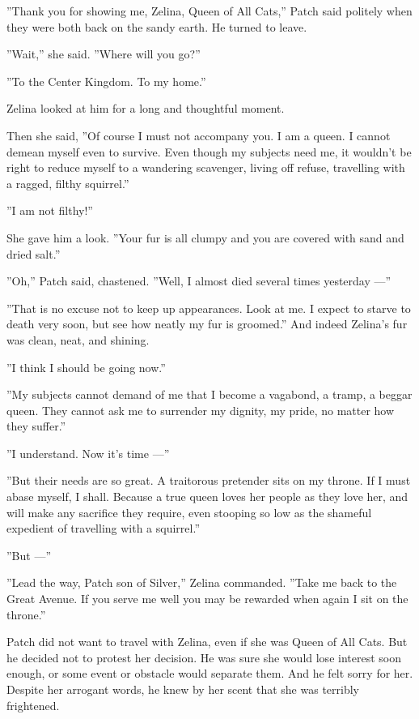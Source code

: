 \documentclass[12pt]{book}
\begin{document}
''Thank you for showing me, Zelina, Queen of All Cats,'' Patch said
politely when they were both back on the sandy earth. He turned to
leave.

''Wait,'' she said. ''Where will you go?''

''To the Center Kingdom. To my home.''

Zelina looked at him for a long and thoughtful moment.

Then she said, ''Of course I must not accompany you. I am a queen. I
cannot demean myself even to survive. Even though my subjects need me,
it wouldn't be right to reduce myself to a wandering scavenger, living
off refuse, travelling with a ragged, filthy squirrel.''

''I am not filthy!''

She gave him a look. ''Your fur is all clumpy and you are covered with
sand and dried salt.''

''Oh,'' Patch said, chastened. ''Well, I almost died several times
yesterday ---''

''That is no excuse not to keep up appearances. Look at me. I expect
to starve to death very soon, but see how neatly my fur is groomed.''
And indeed Zelina's fur was clean, neat, and shining.

''I think I should be going now.''

''My subjects cannot demand of me that I become a vagabond, a tramp, a
beggar queen. They cannot ask me to surrender my dignity, my pride, no
matter how they suffer.''

''I understand. Now it's time ---''

''But their needs are so great. A traitorous pretender sits on my
throne. If I must abase myself, I shall. Because a true queen loves
her people as they love her, and will make any sacrifice they require,
even stooping so low as the shameful expedient of travelling with a
squirrel.''

''But ---''

''Lead the way, Patch son of Silver,'' Zelina commanded. ''Take me
back to the Great Avenue. If you serve me well you may be rewarded
when again I sit on the throne.''

Patch did not want to travel with Zelina, even if she was Queen of All
Cats. But he decided not to protest her decision. He was sure she
would lose interest soon enough, or some event or obstacle would
separate them. And he felt sorry for her. Despite her arrogant words,
he knew by her scent that she was terribly frightened.
\end{document}
